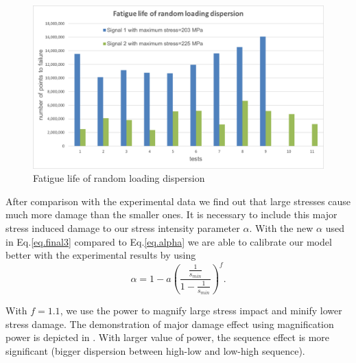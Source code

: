 \begin{figure}[!h]
	\centering
	\includegraphics[width=\textwidth]{figures//randomdispersion.png} 
	\caption{Fatigue life of random loading dispersion}
	\label{fig.randomdispersion}
\end{figure}

After comparison with the experimental data we find out that large stresses cause much more damage than the smaller ones. It is necessary to include this major stress induced damage to our stress intensity parameter $\alpha$. With the new $\alpha$ used in Eq.\eqref{eq.final3} compared to Eq.\eqref{eq.alpha} we are able to calibrate our model better with the experimental results by using 
\begin{equation}
\alpha=1-a\left(  \dfrac{\frac{1}{s_{min}}}{1-\frac{1}{s_{min}}} \right) ^{f}.
\label{eq.majoralp}
\end{equation}


With $f=1.1$, we use the power to magnify large stress impact and minify lower stress damage.  The demonstration of major damage effect using magnification power is depicted in . With larger value of power, the sequence effect is more significant (bigger dispersion between high-low and low-high sequence).

